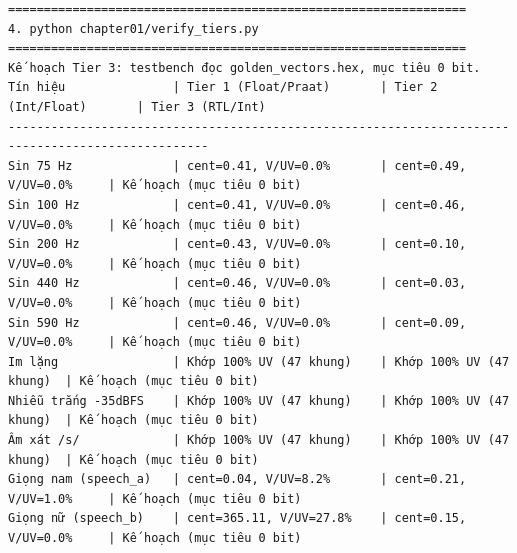 \documentclass[11pt,a4paper]{article}
\begin{document}
\begin{scriptsize}
\begin{verbatim}
================================================================
4. python chapter01/verify_tiers.py
================================================================
Kế hoạch Tier 3: testbench đọc golden_vectors.hex, mục tiêu 0 bit.
Tín hiệu               | Tier 1 (Float/Praat)       | Tier 2 (Int/Float)       | Tier 3 (RTL/Int)    
--------------------------------------------------------------------------------------------------
Sin 75 Hz              | cent=0.41, V/UV=0.0%       | cent=0.49, V/UV=0.0%     | Kế hoạch (mục tiêu 0 bit)
Sin 100 Hz             | cent=0.41, V/UV=0.0%       | cent=0.46, V/UV=0.0%     | Kế hoạch (mục tiêu 0 bit)
Sin 200 Hz             | cent=0.43, V/UV=0.0%       | cent=0.10, V/UV=0.0%     | Kế hoạch (mục tiêu 0 bit)
Sin 440 Hz             | cent=0.46, V/UV=0.0%       | cent=0.03, V/UV=0.0%     | Kế hoạch (mục tiêu 0 bit)
Sin 590 Hz             | cent=0.46, V/UV=0.0%       | cent=0.09, V/UV=0.0%     | Kế hoạch (mục tiêu 0 bit)
Im lặng                | Khớp 100% UV (47 khung)    | Khớp 100% UV (47 khung)  | Kế hoạch (mục tiêu 0 bit)
Nhiễu trắng -35dBFS    | Khớp 100% UV (47 khung)    | Khớp 100% UV (47 khung)  | Kế hoạch (mục tiêu 0 bit)
Âm xát /s/             | Khớp 100% UV (47 khung)    | Khớp 100% UV (47 khung)  | Kế hoạch (mục tiêu 0 bit)
Giọng nam (speech_a)   | cent=0.04, V/UV=8.2%       | cent=0.21, V/UV=1.0%     | Kế hoạch (mục tiêu 0 bit)
Giọng nữ (speech_b)    | cent=365.11, V/UV=27.8%    | cent=0.15, V/UV=0.0%     | Kế hoạch (mục tiêu 0 bit)
\end{verbatim}
\end{scriptsize}
\end{document}

